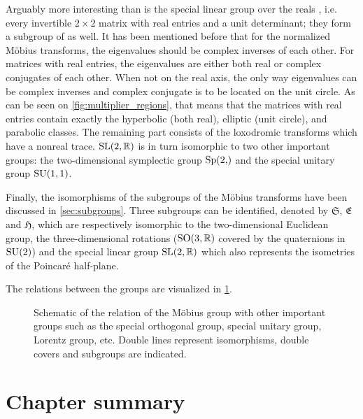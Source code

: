 Arguably more interesting than  is the special linear group over the reals , i.e. every invertible \(2 \times 2\) matrix with real entries and a unit determinant; they form a subgroup of  as well. It has been mentioned before that for the normalized Möbius transforms, the eigenvalues should be complex inverses of each other. For matrices with real entries, the eigenvalues are either both real or complex conjugates of each other. When not on the real axis, the only way eigenvalues can be complex inverses and complex conjugate is to be located on the unit circle. As can be seen on \cref{fig:multiplier_regions}, that means that the matrices with real entries contain exactly the hyperbolic (both real), elliptic (unit circle), and parabolic classes. The remaining part consists of the loxodromic transforms which have a nonreal trace. $\mathrm{SL}(2, \mathbb{R})$ is in turn isomorphic to two other important groups: the two-dimensional symplectic group $\spgroup{2}$ and the special unitary group $\mathrm{SU}(1,1)$.

Finally, the isomorphisms of the subgroups of the Möbius transforms have been discussed in \cref{sec:subgroups}. Three subgroups can be identified, denoted by $\mathfrak{S}$, $\mathfrak{E}$ and $\mathfrak{H}$, which are respectively isomorphic to the two-dimensional Euclidean group, the three-dimensional rotations ($\mathrm{SO}(3, \mathbb{R})$ covered by the quaternions in $\mathrm{SU}(2)$) and the special linear group $\mathrm{SL}(2, \mathbb{R})$ which also represents the isometries of the Poincaré half-plane.

The relations between the groups are visualized in \cref{fig:group_relations}.

\begin{figure}
    \centering
    
    \caption{Schematic of the relation of the Möbius group with other important groups such as the special orthogonal group, special unitary group, Lorentz group, etc. Double lines represent isomorphisms, double covers and subgroups are indicated.}
    \label{fig:group_relations}
\end{figure}

\section*{Chapter summary}